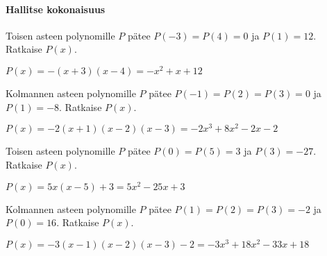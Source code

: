 \begin{tehtavasivu}
\paragraph*{Hallitse kokonaisuus}

\begin{tehtava}
    Toisen asteen polynomille $P$ pätee $P(-3)=P(4)=0$ ja $P(1)=12$. Ratkaise $P(x)$.
    \begin{vastaus}
        $P(x)=-(x+3)(x-4)=-x^2+x+12$
    \end{vastaus}
\end{tehtava}

\begin{tehtava}
    Kolmannen asteen polynomille $P$ pätee $P(-1)=P(2)=P(3)=0$ ja $P(1)=-8$. Ratkaise $P(x)$.
    \begin{vastaus}
        $P(x)=-2(x+1)(x-2)(x-3)=-2x^3+8x^2-2x-2$
    \end{vastaus}
\end{tehtava}

\begin{tehtava}
Toisen asteen polynomille $P$ pätee $P(0)=P(5)=3$ ja $P(3)=-27$. Ratkaise $P(x)$.
\begin{vastaus}
$P(x)=5x(x-5)+3=5x^2-25x+3$
\end{vastaus}
\end{tehtava}

\begin{tehtava}
Kolmannen asteen polynomille $P$ pätee $P(1)=P(2)=P(3)=-2$ ja $P(0)=16$. Ratkaise $P(x)$.
\begin{vastaus}
$P(x)=-3(x-1)(x-2)(x-3)-2=-3x^3+18x^2-33x+18$
\end{vastaus}
\end{tehtava}

\end{tehtavasivu}
